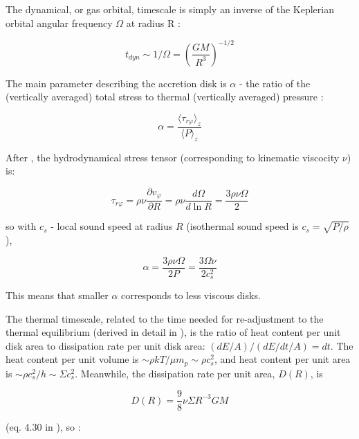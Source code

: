 \documentclass[twocolumn]{aastex62}
\begin{document}
The dynamical, or gas orbital, timescale is simply  an inverse of the Keplerian orbital angular frequency $ \Omega$  at radius R  : 

\begin{equation}
t_{dyn} {\sim}  1 / \Omega = \left( \frac{GM}{R^{3}}\right)^{-1/2}
\end{equation}


The main parameter  describing the accretion disk is $\alpha$ - the ratio of the (vertically averaged) total stress to thermal (vertically averaged) pressure \citep{lasota2016} : 

\begin{equation}
\alpha= \frac{\langle \tau_{r\varphi}  \rangle_{z} }{\langle P \rangle _{z}} 
\end{equation}


After \cite{lasota2016},  the hydrodynamical stress tensor (corresponding to  kinematic viscocity $\nu$) is:

\begin{equation}
\tau_{r\varphi } = \rho \nu \frac{\partial v_{\varphi}}{\partial R} = \rho \nu \frac{d \Omega}{d \ln{R}} = \frac{3 \rho \nu \Omega}{2}  
\end{equation}

so  with  $c_{s}$ -  local sound speed at radius $R$ (isothermal sound speed is $c_{s} = \sqrt{P/\rho}$),

\begin{equation}
\alpha  =   \frac{3 \rho \nu \Omega}{2 P} =  \frac{3 \Omega \nu}{2 c_{s}^{2}}
\end{equation}



This means that smaller $\alpha$ corresponds to less viscous disks. 


The thermal timescale, related to the time needed for re-adjustment to the thermal equilibrium (derived in detail in \cite{frank2002}), is the ratio of heat content per unit disk area to dissipation rate per unit disk area: $(dE / A) / (dE/dt /  A) = dt $.  The heat content per unit volume is ${\sim} \rho k T / \mu m_{p} {\sim} \rho c_{s}^{2}$, and heat content per unit area is  ${\sim} \rho c_{s}^{2} / h {\sim} \Sigma c_{s}^{2}$. Meanwhile, the dissipation rate per unit area, $D(R)$, is 

\begin{equation}
D(R) = \frac{9}{8} \nu \Sigma R^{-3} G M
\end{equation}

(eq. 4.30 in \citealt{frank2002}), so :
\end{document}
